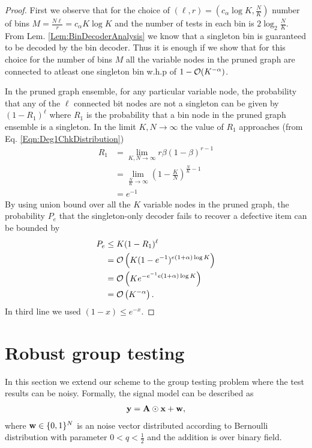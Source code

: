 \begin{proof}
First we observe that for the choice of $(\ell,r)=(c_\alpha \log K,\frac{N}{K})$ number of bins $M=\frac{N\ell}{r}=c_\alpha K \log K$ and the number of tests in each bin is $2\log_2 \frac{N}{K}$. From Lem. \ref{Lem:BinDecoderAnalysis} we know that a singleton bin is guaranteed to be decoded by the bin decoder. Thus it is enough if we show that for this choice for the number of bins $M$ all the variable nodes in the pruned graph are connected to atleast one singleton bin w.h.p of $1-\mathcal{O}(K^{-\alpha})$.

In the pruned graph ensemble, for any particular variable node, the probability that any of the $\ell$ connected bit nodes are not a singleton can be given by $(1-R_1)^\ell$ where $R_1$ is the probability that a bin node in the pruned graph ensemble is a singleton. In the limit $K,N\rightarrow \infty$ the value of $R_1$ approaches (from Eq. \ref{Eqn:Deg1ChkDistribution})
\begin{align*}
R_1&=\lim _{K,N\rightarrow\infty}r\beta(1-\beta)^{r-1}\\
     &=\lim _{\frac{N}{K}\rightarrow\infty}\left(1-\frac{K}{N}\right)^{\frac{N}{K}-1}\\
     &= e^{-1}
\end{align*} 
By using union bound over all the $K$ variable nodes in the pruned graph, the probability $P_e$ that the singleton-only decoder fails to recover a defective item can be bounded by
\begin{align*}
P_e&\leq K(1-R_1)^\ell \\
&=\mathcal{O}\left(K(1-e^{-1})^{e(1+\alpha)\log K}\right)\\
&=\mathcal{O}\left(Ke^{-e^{-1}e(1+\alpha)\log K}\right)\\
&=\mathcal{O}\left(K^{-\alpha}\right).
\end{align*}
In third line we used $(1-x)\leq e^{-x}$.
\end{proof}

\section{Robust group testing}
\label{Sec:NoisyGroupTesting}
In this section we extend our scheme to the group testing problem where the test results can be noisy. Formally, the signal model can be described as 
\begin{align*}
\mathbf{y=A}\odot \mathbf{x+w},
\end{align*}
where $\mathbf{w}\in\{0,1\}^N$ is an \iid noise vector distributed according to Bernoulli distribution with parameter $0<q<\frac{1}{2}$ and the addition is over binary field.

